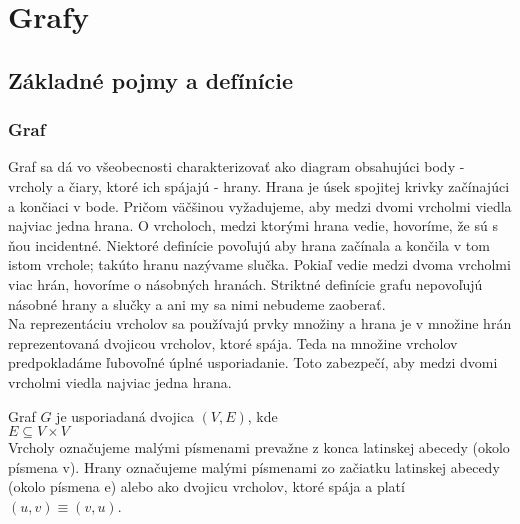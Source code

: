 \chapter{Grafy}
\thispagestyle{empty}

\section{Základné pojmy a defínície}
\subsection{Graf}
Graf sa dá vo všeobecnosti charakterizovať ako diagram obsahujúci body - vrcholy a čiary, ktoré ich spájajú - hrany. Hrana je úsek spojitej krivky začínajúci a končiaci v bode. Pričom väčšinou vyžadujeme, aby medzi dvomi vrcholmi viedla najviac jedna hrana. O vrcholoch, medzi ktorými hrana vedie, hovoríme, že sú s ňou incidentné. Niektoré definície povoľujú aby hrana začínala a končila v tom istom vrchole; takúto hranu nazývame slučka. Pokiaľ vedie medzi dvoma vrcholmi viac hrán, hovoríme o násobných hranách. Striktné definície grafu nepovoľujú násobné hrany a slučky a ani my sa nimi nebudeme zaoberať.\\
Na reprezentáciu vrcholov sa používajú prvky množiny a hrana je v množine hrán reprezentovaná dvojicou vrcholov, ktoré spája. Teda na množine vrcholov predpokladáme ľubovoľné úplné usporiadanie. Toto zabezpečí, aby medzi dvomi vrcholmi viedla najviac jedna hrana.\\

\begin{defin}
Graf $G$ je usporiadaná dvojica $(V,E)$, kde\\
$E \subseteq V \times  V$\\
Vrcholy označujeme malými písmenami prevažne z konca latinskej abecedy (okolo písmena v). Hrany označujeme malými písmenami zo začiatku latinskej abecedy (okolo písmena e) alebo ako dvojicu vrcholov, ktoré spája a platí $(u,v) \equiv (v,u)$.
\end{defin}


%  

